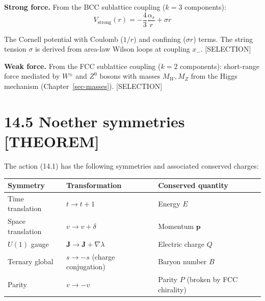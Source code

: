 \documentclass[
  11pt,
  letterpaper,
  twoside,
  openright]{book}
\begin{document}
\textbf{Strong force.} From the BCC sublattice coupling (\(k = 3\)
components): \[
V_{\text{strong}}(r) = -\frac{4}{3} \frac{\alpha_s}{r} + \sigma r
\tag{14.10}
\]

The Cornell potential with Coulomb (\(1/r\)) and confining
(\(\sigma r\)) terms. The string tension \(\sigma\) is derived from
area-law Wilson loops at coupling \(x_-\). {[}SELECTION{]}

\textbf{Weak force.} From the FCC sublattice coupling (\(k = 2\)
components): short-range force mediated by \(W^\pm\) and \(Z^0\) bosons
with masses \(M_W, M_Z\) from the Higgs mechanism
(Chapter~\ref{sec-masses}). {[}SELECTION{]}

\section{14.5 Noether symmetries
{[}THEOREM{]}}\label{noether-symmetries-theorem}

The action (14.1) has the following symmetries and associated conserved
charges:

\begin{longtable}[]{@{}
  >{\raggedright\arraybackslash}p{}
  >{\raggedright\arraybackslash}p{}
  >{\raggedright\arraybackslash}p{}@{}}
\toprule\noalign{}
\begin{minipage}[b]{\linewidth}\raggedright
Symmetry
\end{minipage} & \begin{minipage}[b]{\linewidth}\raggedright
Transformation
\end{minipage} & \begin{minipage}[b]{\linewidth}\raggedright
Conserved quantity
\end{minipage} \\
\midrule\noalign{}
\endhead
\bottomrule\noalign{}
\endlastfoot
Time translation & \(t \to t + 1\) & Energy \(E\) \\
Space translation & \(v \to v + \delta\) & Momentum \(\mathbf{p}\) \\
\(U(1)\) gauge & \(\mathbf{J} \to \mathbf{J} + \nabla \lambda\) &
Electric charge \(Q\) \\
Ternary global & \(s \to -s\) (charge conjugation) & Baryon number
\(B\) \\
Parity & \(v \to -v\) & Parity \(P\) (broken by FCC chirality) \\
\end{longtable}
\end{document}
